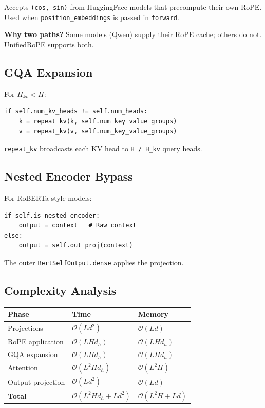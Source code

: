 Accepts \texttt{(cos, sin)} from HuggingFace models that precompute their own 
RoPE. Used when \texttt{position\_embeddings} is passed in \texttt{forward}.

\textbf{Why two paths?} Some models (Qwen) supply their RoPE cache; others do 
not. UnifiedRoPE supports both.

\subsection{GQA Expansion}

For $H_{kv} < H$:

\begin{lstlisting}
if self.num_kv_heads != self.num_heads:
    k = repeat_kv(k, self.num_key_value_groups)
    v = repeat_kv(v, self.num_key_value_groups)
\end{lstlisting}

\texttt{repeat\_kv} broadcasts each KV head to \texttt{H / H\_{kv}} query heads.

\subsection{Nested Encoder Bypass}

For RoBERTa-style models:

\begin{lstlisting}
if self.is_nested_encoder:
    output = context   # Raw context
else:
    output = self.out_proj(context)
\end{lstlisting}

The outer \texttt{BertSelfOutput.dense} applies the projection.

\subsection{Complexity Analysis}

\begin{table}[H]
\centering
\small
\begin{tabular}{lll}
\toprule
\textbf{Phase} & \textbf{Time} & \textbf{Memory} \\
\midrule
Projections & $\mathcal{O}(L d^2)$ & $\mathcal{O}(L d)$ \\
RoPE application & $\mathcal{O}(L H d_h)$ & $\mathcal{O}(L H d_h)$ \\
GQA expansion & $\mathcal{O}(L H d_h)$ & $\mathcal{O}(L H d_h)$ \\
Attention & $\mathcal{O}(L^2 H d_h)$ & $\mathcal{O}(L^2 H)$ \\
Output projection & $\mathcal{O}(L d^2)$ & $\mathcal{O}(L d)$ \\
\textbf{Total} & $\mathcal{O}(L^2 H d_h + L d^2)$ & $\mathcal{O}(L^2 H + L d)$ \\
\bottomrule
\end{tabular}
\end{table}

